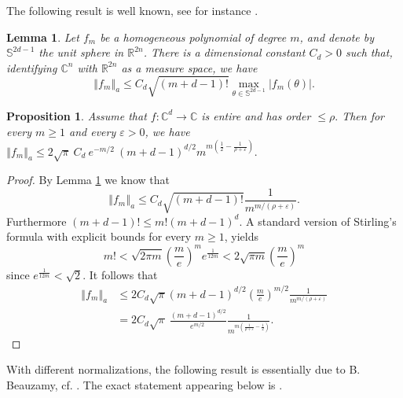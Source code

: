 \documentclass[12pt]{amsart}
\newtheorem{lemma}[theorem]{Lemma}
\newtheorem{proposition}[theorem]{Proposition}
\begin{document}
The following result is well known, see for instance \cite[Lemma 17]{AlRe23}.

\begin{lemma}
	\label{lemma17} \label{Bargma} Let $f_{m}$ be a homogeneous polynomial of
	degree $m$, and denote by $\mathbb{S}^{2d-1}$ the unit sphere in
	$\mathbb{R}^{2n}$. There is a dimensional constant $C_{d}>0$ such that,
	identifying $\mathbb{C}^{n}$ with $\mathbb{R}^{2n}$ as a measure space, we
	have
	\[
	\left\Vert f_{m}\right\Vert _{a}\leq C_{d}\sqrt{\left(  m+d-1\right)  !}
	\max_{\theta\in\mathbb{S}^{2d-1}}\left\vert f_{m}\left(  \theta\right)
	\right\vert .
	\]
	
\end{lemma}

\begin{proposition}
	\label{cond2} Assume that $f:\mathbb{C}^{d}\rightarrow\mathbb{C}$ is entire
	and has order $\leq\rho.$ Then for every $m\geq1$ and every $\varepsilon>0$,
	we have $\left\Vert f_{m}\right\Vert _{a} \leq2\sqrt{\pi} \ C_{d} \ e^{- m/2}
	\ \left(  m+d-1\right)  ^{d/2} m^{m\left(  \frac{1}{2} - \frac{1}%
		{\rho+\varepsilon} \right)  }. $
\end{proposition}

\begin{proof}
	By Lemma \ref{lemma17} we know that
	\[
	\left\Vert f_{m}\right\Vert _{a}\leq C_{d}\sqrt{\left(  m+d-1\right)  !}%
	\frac{1}{m^{m/\left(  \rho+\varepsilon\right)  }}.
	\]
	Furthermore $\left(  m+d-1\right)  !\leq m!\left(  m+d-1\right)  ^{d}$. A
	standard version of Stirling's formula with explicit bounds for every $m\ge1$,
	yields
	\[
	m! < \sqrt{2\pi m}\left(  \frac{m}{e}\right)  ^{m}e^{\frac{1}{12m}} < 2
	\sqrt{\pi m}\left(  \frac{m}{e}\right)  ^{m}%
	\]
	since $ e^{\frac{1}{12 m}} < \sqrt{2}$. It follows that
	\begin{align*}
		\left\Vert f_{m}\right\Vert _{a}  &  \leq2C_{d}\sqrt{\pi}\left(  m+d-1\right)
		^{d/2}\left(  \frac{m}{e}\right)  ^{m/2}\frac{1}{m^{m/\left(  \rho
				+\varepsilon^{}\right)  }}\\
		&  =2C_{d}\sqrt{\pi} \ \frac{\left(  m+d-1\right)  ^{d/2}}{e^{m/2} \ }\frac
		{1}{ m^{m\left(  \frac{1}{\rho+\varepsilon}-\frac{1}{2}\right)  }}.
	\end{align*}
	
\end{proof}

With different normalizations, the following result is essentially due to B.
Beauzamy, cf. \cite[Formula (6)]{Beau97}. The exact statement appearing below is
\cite[Lemma 13]{AlRe23}.
\end{document}
